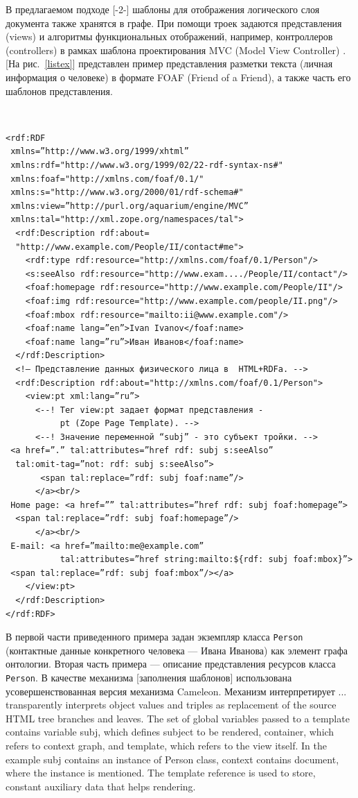 \documentclass[utf8]{../IncArticle}
\newcommand{\e}[2][fcolor]{\textcolor{pcolor}{[}\textcolor{#1}{#2}\textcolor{pcolor}{]}}
\begin{document}
В предлагаемом подходе [-2-] шаблоны для отображения логического слоя
документа также хранятся в графе.  При помощи троек задаются
представления (views) и алгоритмы функциональных отображений,
например, контроллеров (controllers) в рамках шаблона проектирования
MVC (Model View Controller) \cite{b2:5}.  \e{На рис.~\ref{listex}}
представлен пример представления разметки текста (личная информация о
человеке) в формате FOAF (Friend of a Friend), а также часть его
шаблонов представления.

\begingroup%
\tt%
\begin{verbatim}
<rdf:RDF
 xmlns=”http://www.w3.org/1999/xhtml”
 xmlns:rdf="http://www.w3.org/1999/02/22-rdf-syntax-ns#"
 xmlns:foaf="http://xmlns.com/foaf/0.1/"
 xmlns:s="http://www.w3.org/2000/01/rdf-schema#"
 xmlns:view=”http://purl.org/aquarium/engine/MVC”
 xmlns:tal="http://xml.zope.org/namespaces/tal">
  <rdf:Description rdf:about=
  "http://www.example.com/People/II/contact#me">
    <rdf:type rdf:resource="http://xmlns.com/foaf/0.1/Person"/>
    <s:seeAlso rdf:resource="http://www.exam..../People/II/contact"/>
    <foaf:homepage rdf:resource="http://www.example.com/People/II"/>
    <foaf:img rdf:resource="http://www.example.com/people/II.png"/>
    <foaf:mbox rdf:resource="mailto:ii@www.example.com"/>
    <foaf:name lang=”en”>Ivan Ivanov</foaf:name>
    <foaf:name lang=”ru”>Иван Иванов</foaf:name>
  </rdf:Description>
  <!— Представление данных физического лица в  HTML+RDFa. -->
  <rdf:Description rdf:about="http://xmlns.com/foaf/0.1/Person">
    <view:pt xml:lang=”ru”>
      <--! Тег view:pt задает формат представления -
           pt (Zope Page Template). -->
      <--! Значение переменной “subj” - это субъект тройки. -->
 <a href=”.” tal:attributes=”href rdf: subj s:seeAlso”
  tal:omit-tag=”not: rdf: subj s:seeAlso”>
       <span tal:replace=”rdf: subj foaf:name”/>
      </a><br/>
 Home page: <a href=”” tal:attributes=”href rdf: subj foaf:homepage”>
  <span tal:replace=”rdf: subj foaf:homepage”/>
      </a><br/>
 E-mail: <a href=”mailto:me@example.com”
           tal:attributes=”href string:mailto:${rdf: subj foaf:mbox}”>
 <span tal:replace=”rdf: subj foaf:mbox”/></a>
    </view:pt>
  </rdf:Description>
</rdf:RDF>
\end{verbatim}
\endgroup

В первой части приведенного примера задан экземпляр класса
\texttt{Person} (контактные данные конкретного человека --- Ивана
Иванова) как элемент графа онтологии.  Вторая часть примера ---
описание представления ресурсов класса \texttt{Person}.  В качестве
механизма \e{заполнения шаблонов} использована усовершенствованная
версия механизма Cameleon.  Механизм интерпретирует ... transparently interprets object
values and triples as replacement of the source HTML tree branches and
leaves. The set of global variables passed to a template contains
variable subj, which defines subject to be rendered, container, which
refers to context graph, and template, which refers to the view
itself. In the example subj contains an instance of Person class,
context contains document, where the instance is mentioned. The
template reference is used to store, constant auxiliary data that
helps rendering.
\end{document}
